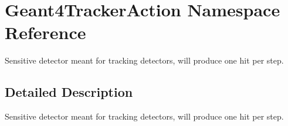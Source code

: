 \hypertarget{namespace_geant4_tracker_action}{
\section{Geant4TrackerAction Namespace Reference}
\label{namespace_geant4_tracker_action}
}


Sensitive detector meant for tracking detectors, will produce one hit per step.  


\subsection{Detailed Description}
Sensitive detector meant for tracking detectors, will produce one hit per step. 